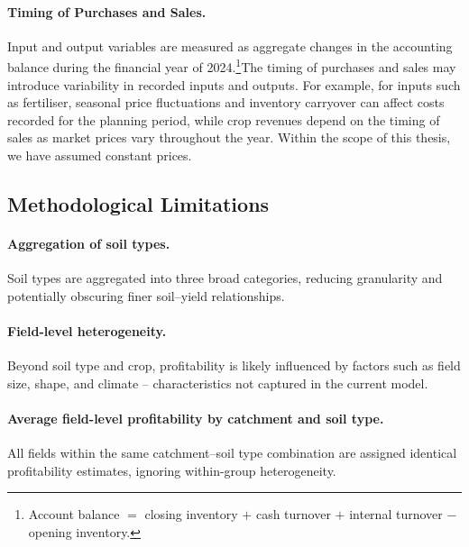 \documentclass[12pt]{article}
\begin{document}
\paragraph{Timing of Purchases and Sales.}
Input and output variables are measured as aggregate changes in the accounting balance during the financial year of 2024.\footnote{Account balance $=$ closing inventory $+$ cash turnover $+$ internal turnover $-$ opening inventory.}The timing of purchases and sales may introduce variability in recorded inputs and outputs. 
For example, for inputs such as fertiliser, seasonal price fluctuations and inventory carryover can affect costs recorded for the planning period, while crop revenues depend on the timing of sales as market prices vary throughout the year. Within the scope of this thesis, we have assumed constant prices.




\subsection{Methodological Limitations}

\paragraph{Aggregation of soil types. }
Soil types are aggregated into three broad categories, reducing granularity and potentially obscuring finer soil--yield relationships.

\paragraph{Field-level heterogeneity.}
Beyond soil type and crop, profitability is likely influenced by factors such as field size, shape, and climate \citep{olsen2017} -- characteristics not captured in the current model.

\paragraph{Average field-level profitability by catchment and soil type.} All fields within the same catchment--soil type combination are assigned identical profitability estimates, ignoring within-group heterogeneity. 
\end{document}
